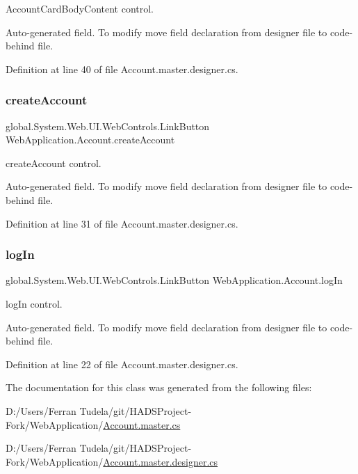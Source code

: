 Account\+Card\+Body\+Content control. 

Auto-\/generated field. To modify move field declaration from designer file to code-\/behind file. 

Definition at line 40 of file Account.\+master.\+designer.\+cs.

\mbox{\label{classWebApplication_1_1Account_ab798aa6d1c321cc04eb646dd29148bee}} 
\subsubsection{\texorpdfstring{createAccount}{createAccount}}
{\footnotesize\ttfamily global.\+System.\+Web.\+U\+I.\+Web\+Controls.\+Link\+Button Web\+Application.\+Account.\+create\+Account\hspace{0.3cm}{\ttfamily [protected]}}



create\+Account control. 

Auto-\/generated field. To modify move field declaration from designer file to code-\/behind file. 

Definition at line 31 of file Account.\+master.\+designer.\+cs.

\mbox{\label{classWebApplication_1_1Account_a4485ffbc1d54a9159accd84df022716b}} 
\subsubsection{\texorpdfstring{logIn}{logIn}}
{\footnotesize\ttfamily global.\+System.\+Web.\+U\+I.\+Web\+Controls.\+Link\+Button Web\+Application.\+Account.\+log\+In\hspace{0.3cm}{\ttfamily [protected]}}



log\+In control. 

Auto-\/generated field. To modify move field declaration from designer file to code-\/behind file. 

Definition at line 22 of file Account.\+master.\+designer.\+cs.



The documentation for this class was generated from the following files\+:\begin{DoxyCompactItemize}
\item 
D\+:/\+Users/\+Ferran Tudela/git/\+H\+A\+D\+S\+Project-\/\+Fork/\+Web\+Application/\mbox{\hyperlink{Account_8master_8cs}{Account.\+master.\+cs}}\item 
D\+:/\+Users/\+Ferran Tudela/git/\+H\+A\+D\+S\+Project-\/\+Fork/\+Web\+Application/\mbox{\hyperlink{Account_8master_8designer_8cs}{Account.\+master.\+designer.\+cs}}\end{DoxyCompactItemize}
